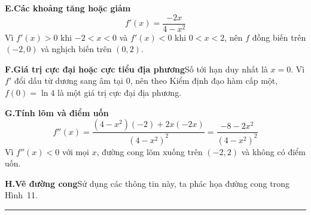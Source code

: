 \documentclass[10pt]{article}
\begin{document}
\begin{minipage}[t]{0.71\textwidth}
    \vspace{2pt}
    \textbf{E.\hspace{0.5em}Các khoảng tăng hoặc giảm}
    \[
    f'(x) = \frac{-2x}{4 - x^2}
    \]
    Vì $f'(x) > 0$ khi $-2 < x < 0$ và $f'(x) < 0$ khi $0 < x < 2$, nên $f$ đồng biến trên $(-2, 0)$ và nghịch biến trên $(0, 2)$.

    \vspace{2pt}
    \textbf{F.\hspace{0.5em}Giá trị cực đại hoặc cực tiểu địa phương}\hspace{0.8em}Số tới hạn duy nhất là $x = 0$. Vì $f'$ đổi dấu từ dương sang âm tại $0$, nên theo Kiểm định đạo hàm cấp một, $f(0) = \ln 4$ là một giá trị cực đại địa phương.

    \vspace{2pt}
    \textbf{G.\hspace{0.5em}Tính lõm và điểm uốn}
    \[
    f''(x) = \frac{(4 - x^2)(-2) + 2x(-2x)}{(4 - x^2)^2} = \frac{-8 - 2x^2}{(4 - x^2)^2}
    \]
    Vì $f''(x) < 0$ với mọi $x$, đường cong lõm xuống trên $(-2, 2)$ và không có điểm uốn.

    \vspace{2pt}
    \textbf{H.\hspace{0.5em}Vẽ đường cong}\hspace{0.8em}Sử dụng các thông tin này, ta phác họa đường cong trong Hình~11.\hfill{\color{stewartcyan}\rule{1.15ex}{1.15ex}}
\end{minipage}
\end{document}
